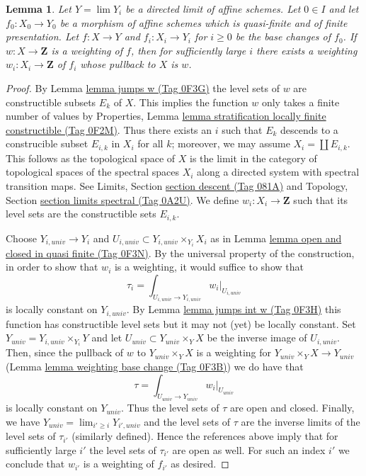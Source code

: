 \documentclass{amsart}
\theoremstyle{plain}
\newtheorem{lemma}[subsection]{Lemma}
\theoremstyle{definition}
\theoremstyle{remark}
\numberwithin{equation}{subsection}
\def\lim{\mathop{\mathrm{lim}}\nolimits}
\begin{document}
\begin{lemma}
\label{lemma-descend-weighting}
Let $Y = \lim Y_i$ be a directed limit of affine schemes. Let $0 \in I$
and let $f_0 : X_0 \to Y_0$ be a morphism of affine schemes which is
quasi-finite and of finite presentation. Let $f : X  \to Y$
and $f_i : X_i \to Y_i$ for $i \geq 0$ be the base changes of $f_0$.
If $w : X \to \mathbf{Z}$ is a weighting of $f$, then for sufficiently
large $i$ there exists a weighting $w_i : X_i \to \mathbf{Z}$
of $f_i$ whose pullback to $X$ is $w$.
\end{lemma}

\begin{proof}
By Lemma \href{https://stacks.math.columbia.edu/tag/0F3G}{lemma jumps w (Tag 0F3G)} the level sets of $w$ are constructible subsets
$E_k$ of $X$. This implies the function $w$ only takes a finite number
of values by Properties, Lemma
\href{https://stacks.math.columbia.edu/tag/0F2M}{lemma stratification locally finite constructible (Tag 0F2M)}.
Thus there exists an $i$ such that $E_k$ descends to a construcible
subset $E_{i, k}$ in $X_i$ for all $k$; moreover, we may assume
$X_i = \coprod E_{i, k}$. This follows as the topological space
of $X$ is the limit in the category of topological spaces
of the spectral spaces $X_i$ along a directed system with
spectral transition maps. See
Limits, Section \href{https://stacks.math.columbia.edu/tag/081A}{section descent (Tag 081A)}
and
Topology, Section \href{https://stacks.math.columbia.edu/tag/0A2U}{section limits spectral (Tag 0A2U)}.
We define $w_i : X_i \to \mathbf{Z}$ such that its level
sets are the constructible sets $E_{i, k}$.

\medskip\noindent
Choose $Y_{i, univ} \to Y_i$ and
$U_{i, univ} \subset Y_{i, univ} \times_{Y_i} X_i$
as in Lemma \href{https://stacks.math.columbia.edu/tag/0F3N}{lemma open and closed in quasi finite (Tag 0F3N)}.
By the universal property of the construction, in order to
show that $w_i$ is a weighting, it would suffice to show
that
$$
\tau_i = \textstyle{\int}_{U_{i, univ} \to Y_{i, univ}} w_i|_{U_{i, univ}}
$$
is locally constant on $Y_{i, univ}$. By Lemma \href{https://stacks.math.columbia.edu/tag/0F3H}{lemma jumps int w (Tag 0F3H)}
this function has constructible level sets but it may
not (yet) be locally constant. Set
$Y_{univ} = Y_{i, univ} \times_{Y_i} Y$
and let $U_{univ} \subset Y_{univ} \times_Y X$
be the inverse image of $U_{i, univ}$.
Then, since the pullback of $w$ to $Y_{univ} \times_Y X$
is a weighting for $Y_{univ} \times_Y X \to Y_{univ}$
(Lemma \href{https://stacks.math.columbia.edu/tag/0F3B}{lemma weighting base change (Tag 0F3B)})
we do have that
$$
\tau = \textstyle{\int}_{U_{univ} \to Y_{univ}} w_i|_{U_{univ}}
$$
is locally constant on $Y_{univ}$. Thus the level sets of
$\tau$ are open and closed. Finally, we have
$Y_{univ} = \lim_{i' \geq i} Y_{i', univ}$
and the level sets of $\tau$ are the inverse limits of the
level sets of $\tau_{i'}$ (similarly defined).
Hence the references above imply that for sufficiently
large $i'$ the level sets of $\tau_{i'}$ are open as well.
For such an index $i'$ we conclude that $w_{i'}$
is a weighting of $f_{i'}$ as desired.
\end{proof}
\end{document}
